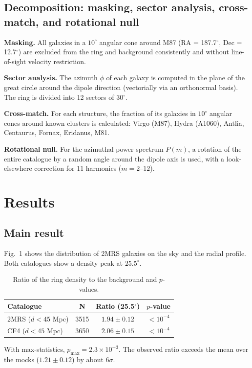 \documentclass[11pt,a4paper]{article}
\begin{document}
\subsection{Decomposition: masking, sector analysis, cross-match, and rotational null}
\textbf{Masking.} All galaxies in a \(10^\circ\) angular cone around M87 (RA = 187.7\(^\circ\), Dec = 12.7\(^\circ\)) are excluded from the ring and background consistently and without line-of-sight velocity restriction.

\textbf{Sector analysis.} The azimuth \(\phi\) of each galaxy is computed in the plane of the great circle around the dipole direction (vectorially via an orthonormal basis). The ring is divided into 12 sectors of 30\(^\circ\).

\textbf{Cross-match.} For each structure, the fraction of its galaxies in \(10^\circ\) angular cones around known clusters is calculated: Virgo (M87), Hydra (A1060), Antlia, Centaurus, Fornax, Eridanus, M81.

\textbf{Rotational null.} For the azimuthal power spectrum \(P(m)\), a rotation of the entire catalogue by a random angle around the dipole axis is used, with a look-elsewhere correction for 11 harmonics (\(m = 2\)--\(12\)).

\section{Results}
\subsection{Main result}
Fig.~1 shows the distribution of 2MRS galaxies on the sky and the radial profile. Both catalogues show a density peak at \(25.5^\circ\).

\begin{table}[H]
\centering
\caption{Ratio of the ring density to the background and \(p\)-values.}
\begin{tabular}{lccc}
\toprule
\textbf{Catalogue} & \textbf{N} & \textbf{Ratio (25.5\(^\circ\))} & \textbf{\(p\)-value} \\
\midrule
2MRS (\(d < 45\) Mpc) & 3515 & \(1.94 \pm 0.12\) & \(< 10^{-4}\) \\
CF4 (\(d < 45\) Mpc)  & 3650 & \(2.06 \pm 0.15\) & \(< 10^{-4}\) \\
\bottomrule
\end{tabular}
\end{table}

With max-statistics, \(p_{\max} = 2.3 \times 10^{-3}\). The observed ratio exceeds the mean over the mocks (\(1.21 \pm 0.12\)) by about \(6\sigma\).
\end{document}
